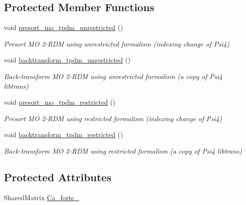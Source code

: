 \subsection*{Protected Member Functions}
\begin{DoxyCompactItemize}
\item 
void \mbox{\hyperlink{classpsi_1_1_t_p_d_m_back_transform_a8870b94142cc7d7226745f834f234ad4}{presort\+\_\+mo\+\_\+tpdm\+\_\+unrestricted}} ()
\begin{DoxyCompactList}\small\item\em Presort MO 2-\/\+R\+DM using unrestricted formalism (indexing change of Psi4) \end{DoxyCompactList}\item 
void \mbox{\hyperlink{classpsi_1_1_t_p_d_m_back_transform_a5a3988253310d2705630ec8f4aae5e31}{backtransform\+\_\+tpdm\+\_\+unrestricted}} ()
\begin{DoxyCompactList}\small\item\em Back-\/transform MO 2-\/\+R\+DM using unrestricted formalism (a copy of Psi4 libtrans) \end{DoxyCompactList}\item 
void \mbox{\hyperlink{classpsi_1_1_t_p_d_m_back_transform_a0a6e7b4afda5fe697f961e6301bea794}{presort\+\_\+mo\+\_\+tpdm\+\_\+restricted}} ()
\begin{DoxyCompactList}\small\item\em Presort MO 2-\/\+R\+DM using restricted formalism (indexing change of Psi4) \end{DoxyCompactList}\item 
void \mbox{\hyperlink{classpsi_1_1_t_p_d_m_back_transform_a4143c3efc0247dda9bfc8cea00b81c2d}{backtransform\+\_\+tpdm\+\_\+restricted}} ()
\begin{DoxyCompactList}\small\item\em Back-\/transform MO 2-\/\+R\+DM using restricted formalism (a copy of Psi4 libtrans) \end{DoxyCompactList}\end{DoxyCompactItemize}
\subsection*{Protected Attributes}
\begin{DoxyCompactItemize}
\item 
Shared\+Matrix \mbox{\hyperlink{classpsi_1_1_t_p_d_m_back_transform_a5cc1fd173565060a44911109c9436ad8}{Ca\+\_\+forte\+\_\+}}
\end{DoxyCompactItemize}



